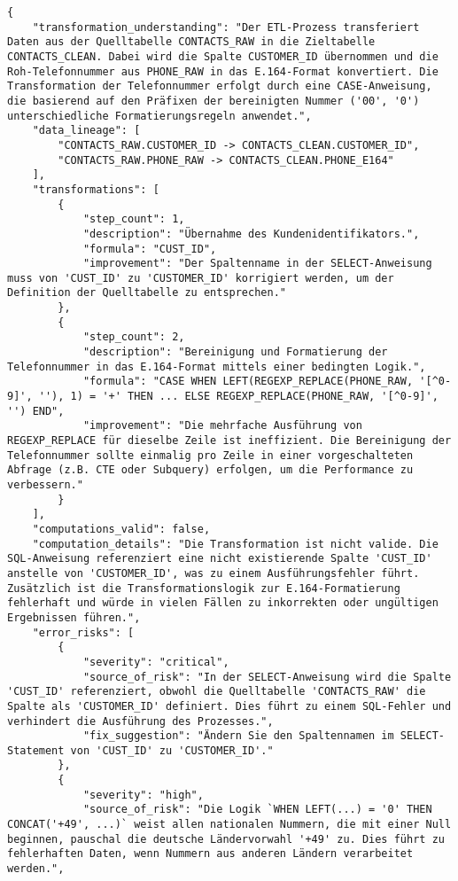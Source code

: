 \begin{lstlisting}[caption={Ausgabe: GEMINI 2.5 Pro Anwendungsfall 3 Robustheitsdurchlauf},label={gemini_case3_prompt3}]
{
    "transformation_understanding": "Der ETL-Prozess transferiert Daten aus der Quelltabelle CONTACTS_RAW in die Zieltabelle CONTACTS_CLEAN. Dabei wird die Spalte CUSTOMER_ID übernommen und die Roh-Telefonnummer aus PHONE_RAW in das E.164-Format konvertiert. Die Transformation der Telefonnummer erfolgt durch eine CASE-Anweisung, die basierend auf den Präfixen der bereinigten Nummer ('00', '0') unterschiedliche Formatierungsregeln anwendet.",
    "data_lineage": [
        "CONTACTS_RAW.CUSTOMER_ID -> CONTACTS_CLEAN.CUSTOMER_ID",
        "CONTACTS_RAW.PHONE_RAW -> CONTACTS_CLEAN.PHONE_E164"
    ],
    "transformations": [
        {
            "step_count": 1,
            "description": "Übernahme des Kundenidentifikators.",
            "formula": "CUST_ID",
            "improvement": "Der Spaltenname in der SELECT-Anweisung muss von 'CUST_ID' zu 'CUSTOMER_ID' korrigiert werden, um der Definition der Quelltabelle zu entsprechen."
        },
        {
            "step_count": 2,
            "description": "Bereinigung und Formatierung der Telefonnummer in das E.164-Format mittels einer bedingten Logik.",
            "formula": "CASE WHEN LEFT(REGEXP_REPLACE(PHONE_RAW, '[^0-9]', ''), 1) = '+' THEN ... ELSE REGEXP_REPLACE(PHONE_RAW, '[^0-9]', '') END",
            "improvement": "Die mehrfache Ausführung von REGEXP_REPLACE für dieselbe Zeile ist ineffizient. Die Bereinigung der Telefonnummer sollte einmalig pro Zeile in einer vorgeschalteten Abfrage (z.B. CTE oder Subquery) erfolgen, um die Performance zu verbessern."
        }
    ],
    "computations_valid": false,
    "computation_details": "Die Transformation ist nicht valide. Die SQL-Anweisung referenziert eine nicht existierende Spalte 'CUST_ID' anstelle von 'CUSTOMER_ID', was zu einem Ausführungsfehler führt. Zusätzlich ist die Transformationslogik zur E.164-Formatierung fehlerhaft und würde in vielen Fällen zu inkorrekten oder ungültigen Ergebnissen führen.",
    "error_risks": [
        {
            "severity": "critical",
            "source_of_risk": "In der SELECT-Anweisung wird die Spalte 'CUST_ID' referenziert, obwohl die Quelltabelle 'CONTACTS_RAW' die Spalte als 'CUSTOMER_ID' definiert. Dies führt zu einem SQL-Fehler und verhindert die Ausführung des Prozesses.",
            "fix_suggestion": "Ändern Sie den Spaltennamen im SELECT-Statement von 'CUST_ID' zu 'CUSTOMER_ID'."
        },
        {
            "severity": "high",
            "source_of_risk": "Die Logik `WHEN LEFT(...) = '0' THEN CONCAT('+49', ...)` weist allen nationalen Nummern, die mit einer Null beginnen, pauschal die deutsche Ländervorwahl '+49' zu. Dies führt zu fehlerhaften Daten, wenn Nummern aus anderen Ländern verarbeitet werden.",

\end{lstlisting}
